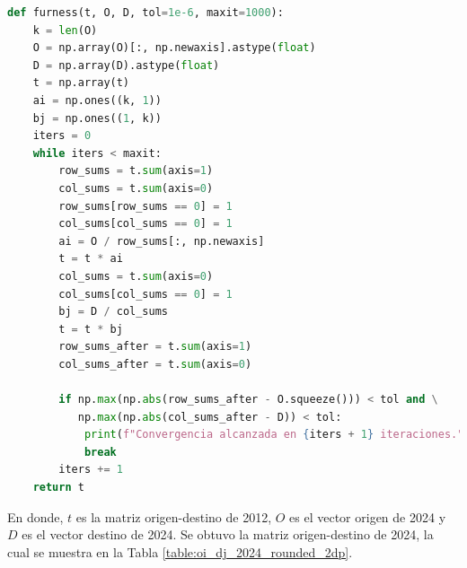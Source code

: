 \documentclass[letterpaper,12pt]{article}
\begin{document}
\begin{lstlisting}[language=Python, label= {lst:furness}]
    def furness(t, O, D, tol=1e-6, maxit=1000):  
    k = len(O)
    O = np.array(O)[:, np.newaxis].astype(float)
    D = np.array(D).astype(float)
    t = np.array(t)
    ai = np.ones((k, 1))
    bj = np.ones((1, k))
    iters = 0
    while iters < maxit:
        row_sums = t.sum(axis=1)
        col_sums = t.sum(axis=0)
        row_sums[row_sums == 0] = 1
        col_sums[col_sums == 0] = 1
        ai = O / row_sums[:, np.newaxis]
        t = t * ai
        col_sums = t.sum(axis=0)
        col_sums[col_sums == 0] = 1
        bj = D / col_sums
        t = t * bj
        row_sums_after = t.sum(axis=1)
        col_sums_after = t.sum(axis=0)
        
        if np.max(np.abs(row_sums_after - O.squeeze())) < tol and \
           np.max(np.abs(col_sums_after - D)) < tol:
            print(f"Convergencia alcanzada en {iters + 1} iteraciones.")
            break
        iters += 1
    return t
\end{lstlisting}

En donde, $t$ es la matriz origen-destino de 2012, $O$ es el vector origen de 2024 y $D$ es el vector destino de 2024. Se obtuvo la matriz origen-destino de 2024, la cual se muestra en la Tabla \ref{table:oi_dj_2024_rounded_2dp}.

\newpage
\end{document}
